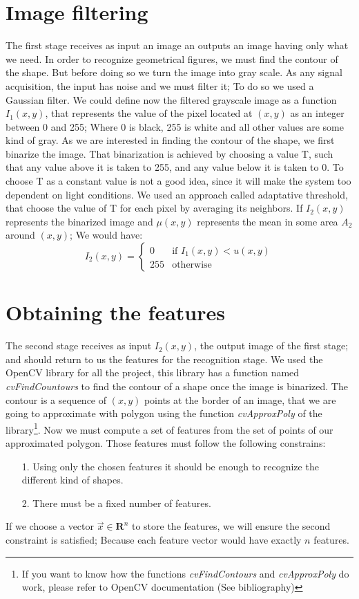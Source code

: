 \documentclass{article}
\begin{document}
	\section{Image filtering}
	The first stage receives as input an image an outputs an image having only
	what we need. In order to recognize geometrical figures, we must find the 
	contour of the shape. But before doing so we turn the image into gray scale.
	As any signal acquisition, the input has noise and we must filter it; To do
	so we used a Gaussian filter. We could define now the filtered grayscale image
	as a function $I_1(x,y)$, that represents the value of the pixel located at
	$(x,y)$ as an integer between 0 and 255; Where 0 is black, 255 is white and
	all other values are some kind of gray.\newline
	As we are interested in finding the contour of the shape, we first binarize
	the image. That binarization is achieved by choosing a value T, such that any
	value above it is taken to 255, and any value below it is taken to 0.
	To choose T as a constant value is not a good idea, since it will make the
	system too dependent on light conditions. We used an approach called
	adaptative threshold, that choose the value of T for each pixel by averaging
	its neighbors. If $I_2(x,y)$ represents the binarized image and $\mu(x,y)$
	represents the mean in some area $A_2$ around $(x,y)$; We would have:
	\[ I_2(x,y) = \left\{ \begin{array}{ll}
		0   & \mbox{if $I_1(x,y) < u(x,y)$} \\
		255 & \mbox{otherwise}
	\end{array} \right. \]
	
	\section{Obtaining the features}
	The second stage receives as input $I_2(x,y)$, the output image of the first
	stage; and should return to us the features for the recognition stage. We used the 
	OpenCV library for all the project, this library has a function named
	\textit{cvFindCountours} to find the contour of a shape once the image is
	binarized. The contour is a sequence of $(x,y)$ points at the border of an image,
	that we are going to approximate with polygon using the function 
	\textit{cvApproxPoly} of the library\footnote {If you want to know how the 
	functions \textit{cvFindContours} and \textit{cvApproxPoly} do work, please 
	refer to OpenCV	documentation (See bibliography)}.
	Now we must compute a set of features from the set of points of our 
	approximated polygon. Those features must follow the following constrains:
	\begin{itemize}
		\item[1.] Using only the chosen features it should be enough to recognize the
			different kind of shapes.
		\item[2.] There must be a fixed number of features.
	\end{itemize}
	If we choose a vector $\vec{x} \in \mathbf{R}^n$ to store the features, we will
	ensure the second constraint is satisfied; Because each feature vector would have
	exactly $n$ features.
	
\end{document}
